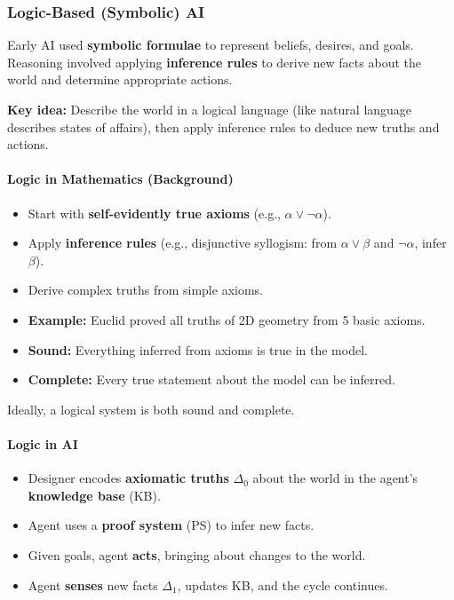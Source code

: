 \bigseparator

\subsubsection{Logic-Based (Symbolic) AI}

\begin{defbox}
Early AI used \textbf{symbolic formulae} to represent beliefs, desires, and goals. Reasoning involved applying \textbf{inference rules} to derive new facts about the world and determine appropriate actions.

\textbf{Key idea:} Describe the world in a logical language (like natural language describes states of affairs), then apply inference rules to deduce new truths and actions.
\end{defbox}

\paragraph*{Logic in Mathematics (Background)}
\begin{itemize}
  \item Start with \textbf{self-evidently true axioms} (e.g., $\alpha \lor \neg\alpha$).
  \item Apply \textbf{inference rules} (e.g., disjunctive syllogism: from $\alpha \lor \beta$ and $\neg\alpha$, infer $\beta$).
  \item Derive complex truths from simple axioms.
  \item \textbf{Example:} Euclid proved all truths of 2D geometry from 5 basic axioms.
\end{itemize}

\begin{defbox}
\begin{itemize}
  \item \textbf{Sound:} Everything inferred from axioms is true in the model.
  \item \textbf{Complete:} Every true statement about the model can be inferred.
\end{itemize}
Ideally, a logical system is both sound and complete.
\end{defbox}

\paragraph*{Logic in AI}
\begin{itemize}
  \item Designer encodes \textbf{axiomatic truths} $\Delta_0$ about the world in the agent's \textbf{knowledge base} (KB).
  \item Agent uses a \textbf{proof system} (PS) to infer new facts.
  \item Given goals, agent \textbf{acts}, bringing about changes to the world.
  \item Agent \textbf{senses} new facts $\Delta_1$, updates KB, and the cycle continues.
\end{itemize}


